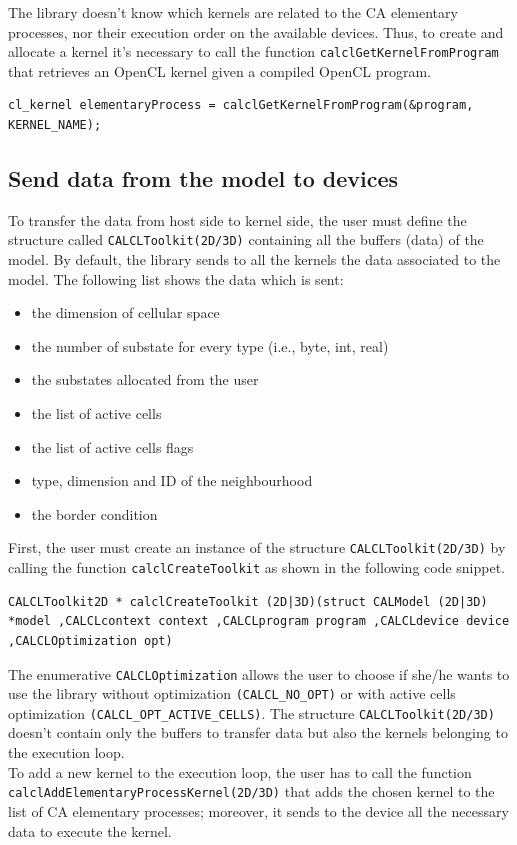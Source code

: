 The library doesn't know which kernels are related to the CA elementary
processes, nor their execution order on the available devices.  Thus, to create and allocate a kernel it's necessary
to call the function \verb'calclGetKernelFromProgram' that retrieves an
OpenCL kernel given a compiled OpenCL program.

\begin{lstlisting}
cl_kernel elementaryProcess = calclGetKernelFromProgram(&program,
KERNEL_NAME);
\end{lstlisting}


\subsection{Send data from the model to devices}

To transfer the data from host side to kernel side, the user must
define the structure called \verb'CALCLToolkit(2D/3D)' containing all
the buffers (data) of the model.  By default, the library sends to all
the kernels the data associated to the model. The following list shows
the data which is sent:
\begin{itemize}
	\item the dimension of cellular space
	\item the number of substate for every type (i.e., byte, int, real)
	\item the substates allocated from the user
	\item the list of active cells
	\item the list of active cells flags
	\item type, dimension and ID of the neighbourhood
	\item the border condition
\end{itemize}


 First, the user must create an instance of the structure
 \verb'CALCLToolkit(2D/3D)' by calling the function
 \verb'calclCreateToolkit' as shown in the following code snippet.

\begin{lstlisting}
CALCLToolkit2D * calclCreateToolkit (2D|3D)(struct CALModel (2D|3D)
*model ,CALCLcontext context ,CALCLprogram program ,CALCLdevice device
,CALCLOptimization opt)
\end{lstlisting}

The enumerative \verb'CALCLOptimization' allows the user to choose if
she/he wants to use the library without optimization \verb|(CALCL_NO_OPT)|
or with active cells optimization \verb|(CALCL_OPT_ACTIVE_CELLS)|. The
structure \verb'CALCLToolkit(2D/3D)' doesn't contain only the buffers
to transfer data but also the kernels belonging to the execution
loop. \\ To add a new kernel to the execution loop, the user has to
call the function \verb'calclAddElementaryProcessKernel(2D/3D)' that
adds the chosen kernel to the list of CA elementary processes; moreover, it
sends to the device all the necessary data to execute the kernel.

